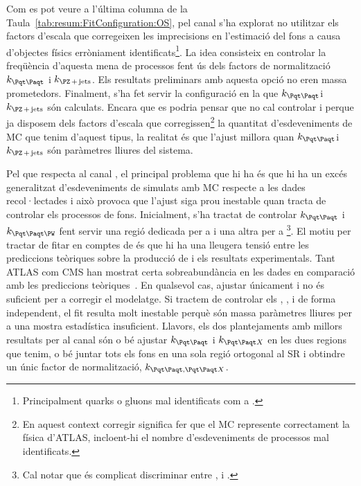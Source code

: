  
Com es pot veure a l'última columna de la Taula~\ref{tab:resum:FitConfiguration:OS}, pel canal \dilepOStau s'ha 
explorat no utilitzar els factors d'escala que corregeixen les imprecisions en l'estimació del fons a causa d'objectes 
físics erròniament identificats\footnote{Principalment quarks o gluons mal identificats com a \tauhad.}. La idea 
consisteix en controlar la freqüència d'aquesta mena de processos fent ús dels factors de normalització $k_{\ttbar}$
i $k_{\Zjets}$. Els resultats preliminars amb aquesta opció no eren massa prometedors.
Finalment, s'ha fet servir la configuració en la que $k_{\ttbar}$i $k_{\Zjets}$ són calculats. Encara que es podria pensar 
que no cal controlar \ttbar i \Zjets perque ja disposem dels factors d'escala que corregissen\footnote{En aquest context corregir significa fer que el MC represente correctament la física d'ATLAS, incloent-hi el nombre d'esdeveniments de processos mal identificats.} la quantitat 
d'esdeveniments de MC que tenim d'aquest tipus, la realitat és que l'ajust millora quan $k_{\ttbar}$i $k_{\Zjets}$  són paràmetres lliures del sistema.
 

Pel que respecta al canal \dilepSStau, el principal problema que hi ha és que hi ha un excés generalitzat 
d'esdeveniments de simulats amb MC respecte a les dades recol·lectades i això provoca que l'ajust siga 
prou inestable quan tracta de controlar els processos de fons. Inicialment, s'ha tractat de controlar $k_{\ttbar}$ 
i $k_{\ttW}$ fent servir una regió dedicada per a \ttbar i una altra per a \ttX\footnote{Cal notar que és 
complicat discriminar entre \ttW, \ttZ i \ttH.}. El motiu per tractar de fitar \ttW en comptes de \ttX és que hi ha 
una lleugera tensió entre les prediccions teòriques sobre la producció de \ttW i els resultats experimentals. 
Tant ATLAS com CMS han mostrat certa sobreabundància en les dades en comparació amb les prediccions 
teòriques~\cite{ATLAS:2023gon, CMS:2022tkv}. En qualsevol cas, ajustar únicament \ttW i \ttbar no és suficient 
per a corregir el modelatge. Si tractem de controlar els \ttbar, \ttW, \ttZ i \ttH de forma independent, el fit resulta 
molt inestable perquè són massa paràmetres lliures per a una mostra estadística insuficient.
Llavors, els dos plantejaments amb millors resultats per al canal \dilepSStau són o bé ajustar $k_{\ttbar}$ i 
$k_{\ttX}$ en les dues regions que tenim, o bé juntar tots els fons en una sola regió ortogonal al SR i obtindre un 
únic factor de normalització, $k_{\ttbar, \ttX}$.



